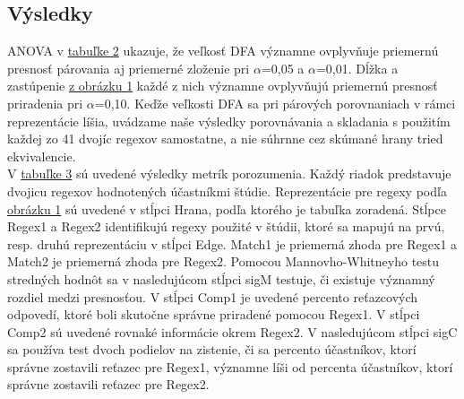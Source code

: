 \documentclass[10pt,twoside,slovak,a4paper]{article}
\begin{document}
\subsection{Výsledky}
ANOVA v \hyperref[fig:table2]{tabuľke 2} ukazuje, že veľkosť DFA významne ovplyvňuje priemernú presnosť párovania aj priemerné zloženie pri $\alpha$=0,05 a $\alpha$=0,01. Dĺžka a zastúpenie \hyperref[fig:obrazok1]{z obrázku 1} každé z nich významne ovplyvňujú priemernú presnosť priradenia pri $\alpha$=0,10. Keďže veľkosti DFA sa pri párových porovnaniach v rámci reprezentácie líšia, uvádzame naše výsledky porovnávania a skladania s použitím každej zo 41 dvojíc regexov samostatne, a nie súhrnne cez skúmané hrany tried ekvivalencie.\cite{Chapman2017}\\
V \hyperref[fig:table3]{tabuľke 3} sú uvedené výsledky metrík porozumenia. Každý riadok predstavuje dvojicu regexov hodnotených účastníkmi štúdie. Reprezentácie pre regexy podľa \hyperref[fig:obrazok1]{obrázku 1} sú uvedené v stĺpci Hrana, podľa ktorého je tabuľka zoradená. Stĺpce Regex1 a Regex2 identifikujú regexy použité v štúdii, ktoré sa mapujú na prvú, resp. druhú reprezentáciu v stĺpci Edge. Match1 je priemerná zhoda pre Regex1 a Match2 je priemerná zhoda pre Regex2. Pomocou Mannovho-Whitneyho testu stredných hodnôt sa v nasledujúcom stĺpci sigM testuje, či existuje významný rozdiel medzi presnosťou. V stĺpci Comp1 je uvedené percento reťazcových odpovedí, ktoré boli skutočne správne priradené pomocou Regex1. V stĺpci Comp2 sú uvedené rovnaké informácie okrem Regex2. V nasledujúcom stĺpci sigC sa používa test dvoch podielov na zistenie, či sa percento účastníkov, ktorí správne zostavili reťazec pre Regex1, významne líši od percenta účastníkov, ktorí správne zostavili reťazec pre Regex2.\cite{Chapman2017}\\\\
\end{document}
